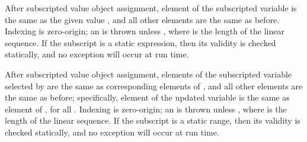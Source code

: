 After subscripted value object assignment, element  of the subscripted variable is the same as the given value ,
and all other elements are the same as before.
Indexing is zero-origin; an  is thrown unless ,
where  is the length of the linear sequence.
If the subscript is a static expression, then its validity is checked statically,
and no exception will occur at run time.



After subscripted value object assignment, elements of the subscripted variable selected by 
are the same as corresponding elements of , and all other elements are the same as before;
specifically, element  of the updated
variable is the same as element  of , for all .
Indexing is zero-origin; an  is thrown unless ,
where  is the length of the linear sequence.
If the subscript is a static range, then its validity is checked statically,
and no exception will occur at run time.



